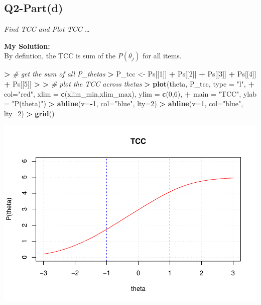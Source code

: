 \documentclass[
]{article}
\newenvironment{Shaded}{\begin{snugshade}}{\end{snugshade}}
\newcommand{\AttributeTok}[1]{\textcolor[rgb]{0.13,0.29,0.53}{#1}}
\newcommand{\CommentTok}[1]{\textcolor[rgb]{0.56,0.35,0.01}{\textit{#1}}}
\newcommand{\DecValTok}[1]{\textcolor[rgb]{0.00,0.00,0.81}{#1}}
\newcommand{\ErrorTok}[1]{\textcolor[rgb]{0.64,0.00,0.00}{\textbf{#1}}}
\newcommand{\FunctionTok}[1]{\textcolor[rgb]{0.13,0.29,0.53}{\textbf{#1}}}
\newcommand{\NormalTok}[1]{#1}
\newcommand{\OtherTok}[1]{\textcolor[rgb]{0.56,0.35,0.01}{#1}}
\newcommand{\SpecialCharTok}[1]{\textcolor[rgb]{0.81,0.36,0.00}{\textbf{#1}}}
\newcommand{\StringTok}[1]{\textcolor[rgb]{0.31,0.60,0.02}{#1}}
\begin{document}
\hypertarget{q2-partd}{%
\subsection{Q2-Part(d)}\label{q2-partd}}

\emph{Find TCC and Plot TCC \ldots{}}

\textbf{My Solution: }\\
By defintion, the TCC is sum of the \(P(\theta_j)\) for all items.

\begin{Shaded}
\begin{Highlighting}[]
\SpecialCharTok{\textgreater{}} \CommentTok{\# get the sum of all P\_thetas}
\ErrorTok{\textgreater{}}\NormalTok{ P\_tcc }\OtherTok{\textless{}{-}}\NormalTok{ Ps[[}\DecValTok{1}\NormalTok{]] }\SpecialCharTok{+}\NormalTok{ Ps[[}\DecValTok{2}\NormalTok{]] }\SpecialCharTok{+}\NormalTok{ Ps[[}\DecValTok{3}\NormalTok{]] }\SpecialCharTok{+}\NormalTok{ Ps[[}\DecValTok{4}\NormalTok{]] }\SpecialCharTok{+}\NormalTok{ Ps[[}\DecValTok{5}\NormalTok{]]}
\SpecialCharTok{\textgreater{}} 
\ErrorTok{\textgreater{}} \CommentTok{\# plot the TCC across thetas}
\ErrorTok{\textgreater{}} \FunctionTok{plot}\NormalTok{(theta, P\_tcc, }\AttributeTok{type =} \StringTok{"l"}\NormalTok{, }
\SpecialCharTok{+}      \AttributeTok{col=}\StringTok{"red"}\NormalTok{, }\AttributeTok{xlim =} \FunctionTok{c}\NormalTok{(xlim\_min,xlim\_max), }\AttributeTok{ylim =} \FunctionTok{c}\NormalTok{(}\DecValTok{0}\NormalTok{,}\DecValTok{6}\NormalTok{),}
\SpecialCharTok{+}      \AttributeTok{main =} \StringTok{"TCC"}\NormalTok{, }\AttributeTok{ylab =} \StringTok{"P(theta)"}\NormalTok{)}
\SpecialCharTok{\textgreater{}} \FunctionTok{abline}\NormalTok{(}\AttributeTok{v=}\SpecialCharTok{{-}}\DecValTok{1}\NormalTok{, }\AttributeTok{col=}\StringTok{"blue"}\NormalTok{, }\AttributeTok{lty=}\DecValTok{2}\NormalTok{)}
\SpecialCharTok{\textgreater{}} \FunctionTok{abline}\NormalTok{(}\AttributeTok{v=}\DecValTok{1}\NormalTok{, }\AttributeTok{col=}\StringTok{"blue"}\NormalTok{, }\AttributeTok{lty=}\DecValTok{2}\NormalTok{)}
\SpecialCharTok{\textgreater{}} \FunctionTok{grid}\NormalTok{()}
\end{Highlighting}
\end{Shaded}

\includegraphics{Assignment_1_files/figure-latex/unnamed-chunk-10-1.pdf}
\end{document}
